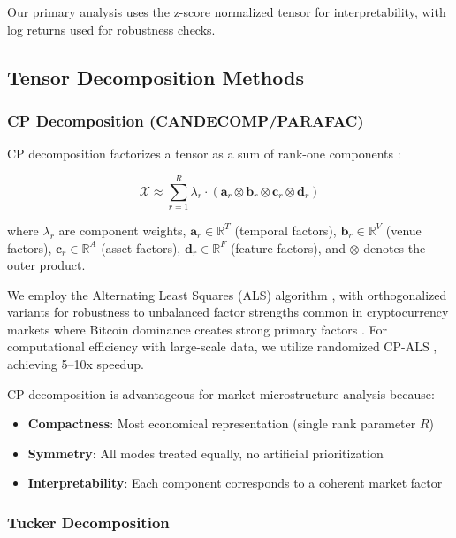 \documentclass{article}
\begin{document}
Our primary analysis uses the z-score normalized tensor for interpretability, with log returns used for robustness checks.

\subsection{Tensor Decomposition Methods}

\subsubsection{CP Decomposition (CANDECOMP/PARAFAC)}

CP decomposition factorizes a tensor as a sum of rank-one components \citep{Kolda2009Tensor,Han2022CP}:

\begin{equation}
\mathcal{X} \approx \sum_{r=1}^{R} \lambda_r \cdot (\mathbf{a}_r \otimes \mathbf{b}_r \otimes \mathbf{c}_r \otimes \mathbf{d}_r)
\label{eq:cp}
\end{equation}

where $\lambda_r$ are component weights, $\mathbf{a}_r \in \mathbb{R}^T$ (temporal factors), $\mathbf{b}_r \in \mathbb{R}^V$ (venue factors), $\mathbf{c}_r \in \mathbb{R}^A$ (asset factors), $\mathbf{d}_r \in \mathbb{R}^F$ (feature factors), and $\otimes$ denotes the outer product.

We employ the Alternating Least Squares (ALS) algorithm \citep{Kolda2009Tensor}, with orthogonalized variants for robustness to unbalanced factor strengths common in cryptocurrency markets where Bitcoin dominance creates strong primary factors \citep{AnandkumarOrthoALS}. For computational efficiency with large-scale data, we utilize randomized CP-ALS \citep{Battaglino2018Practical}, achieving 5--10x speedup.

CP decomposition is advantageous for market microstructure analysis because:

\begin{itemize}[leftmargin=*]
    \item \textbf{Compactness}: Most economical representation (single rank parameter $R$)
    \item \textbf{Symmetry}: All modes treated equally, no artificial prioritization
    \item \textbf{Interpretability}: Each component corresponds to a coherent market factor
\end{itemize}

\subsubsection{Tucker Decomposition}
\end{document}
